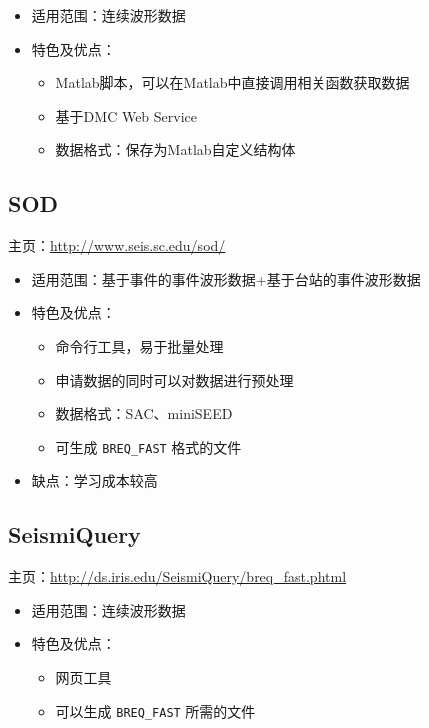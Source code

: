 \begin{itemize}
\item 适用范围：连续波形数据
\item 特色及优点：
    \begin{itemize}
    \item Matlab脚本，可以在Matlab中直接调用相关函数获取数据
    \item 基于DMC Web Service
    \item 数据格式：保存为Matlab自定义结构体
    \end{itemize}
\end{itemize}

\subsection{SOD}
主页：\url{http://www.seis.sc.edu/sod/}

\begin{itemize}
\item 适用范围：基于事件的事件波形数据+基于台站的事件波形数据
\item 特色及优点：
    \begin{itemize}
    \item 命令行工具，易于批量处理
    \item 申请数据的同时可以对数据进行预处理
    \item 数据格式：SAC、miniSEED
    \item 可生成 \texttt{BREQ\_FAST} 格式的文件
    \end{itemize}
\item 缺点：学习成本较高
\end{itemize}

\subsection{SeismiQuery}
主页：\url{http://ds.iris.edu/SeismiQuery/breq_fast.phtml}

\begin{itemize}
\item 适用范围：连续波形数据
\item 特色及优点：
    \begin{itemize}
    \item 网页工具
    \item 可以生成 \texttt{BREQ\_FAST} 所需的文件
    \end{itemize}
\end{itemize}
